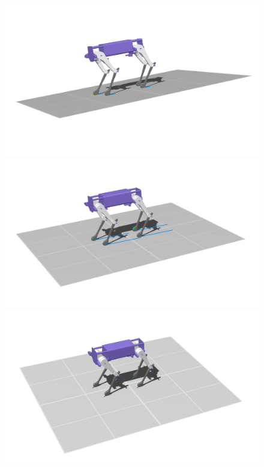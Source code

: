      \begin{figure}[h!]
    \centering
        \begin{minipage}{0.3\textwidth}
            \centering
            \includegraphics[width=\textwidth]{figures/lkgswing_1_crop.png} %
        \end{minipage}
        \begin{minipage}{0.3\textwidth}
            \centering
            \includegraphics[width=\textwidth]{figures/lkgswing_2_crop.png} %
        \end{minipage}
        \begin{minipage}{0.3\textwidth}
            \centering
            \includegraphics[width=\textwidth]{figures/lkgswing_3_crop.png} %
        \end{minipage}
        


\end{figure}
